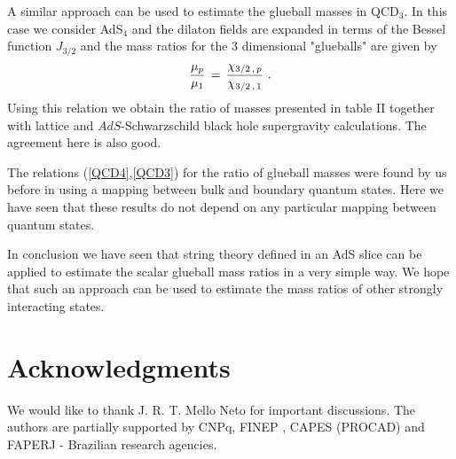 \documentclass[a4paper,twocolumn,prl,groupedaddress,nofootinbib,showpacs]{revtex4}
\begin{document}
A similar approach can be used to  estimate the glueball masses in 
QCD$_3$. In this case we consider  AdS$_{4}$ and the dilaton fields 
are expanded in terms of the Bessel function $J_{3/2} $ and the 
mass ratios for the $3$ dimensional "glueballs"  are given by 
\begin{equation}
\label{QCD3}
{ \mu_p\over \mu_1 }\,=\,{\chi_{3/2\,,\,p}\over \chi_{3/2\,,\,1}}\,\,.
\end{equation}
\noindent 
Using this relation we obtain the ratio of masses presented in table
II together with lattice and $AdS$-Schwarzschild black hole supergravity 
calculations. The agreement here is also good.

The relations (\ref{QCD4},\ref{QCD3}) for the ratio of glueball masses 
were found by us before in \cite{BB4} using a mapping between
bulk and boundary quantum states.   
Here we have seen that these results do not depend on any particular  
mapping between quantum states.

In conclusion we have seen that string theory defined in an AdS slice 
can be applied to estimate the scalar glueball mass ratios in a very
simple way. We hope that such an approach can be used to  
estimate the mass ratios of other strongly interacting states.
  
 
\section*{Acknowledgments}
We would like to thank J. R. T. Mello Neto for important discussions.
The authors are partially supported by CNPq, FINEP , CAPES (PROCAD) 
and FAPERJ - Brazilian research agencies. 



  

\end{document}
